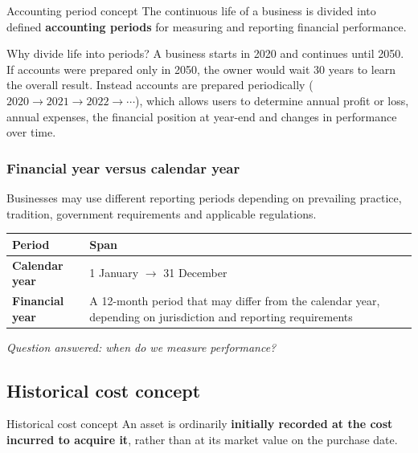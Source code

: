\documentclass[11pt,a4paper]{article}
\begin{document}
\begin{defbox}{Accounting period concept}
The continuous life of a business is divided into defined \textbf{accounting periods} for measuring and reporting
financial performance.
\end{defbox}

\begin{exbox}{Why divide life into periods?}
A business starts in 2020 and continues until 2050. If accounts were prepared only in 2050, the owner would wait
30 years to learn the overall result. Instead accounts are prepared periodically
($2020\rightarrow2021\rightarrow2022\rightarrow\cdots$), which allows users to determine annual profit or loss, annual
expenses, the financial position at year-end and changes in performance over time.
\end{exbox}

\subsubsection{Financial year versus calendar year}

Businesses may use different reporting periods depending on prevailing practice, tradition, government requirements
and applicable regulations.

\begin{center}
\small
\begin{tabularx}{\textwidth}{@{}l Y@{}}
\toprule
{}\textbf{Period} & \textbf{Span}\\
\midrule
\textbf{Calendar year} & 1 January $\rightarrow$ 31 December\\
\textbf{Financial year} & A 12-month period that may differ from the calendar year, depending on jurisdiction and reporting requirements\\
\bottomrule
\end{tabularx}
\end{center}

\begin{keybox}
\emph{Question answered: when do we measure performance?}
\end{keybox}

\subsection{Historical cost concept}

\begin{defbox}{Historical cost concept}
An asset is ordinarily \textbf{initially recorded at the cost incurred to acquire it}, rather than at its market value
on the purchase date.
\end{defbox}
\end{document}
